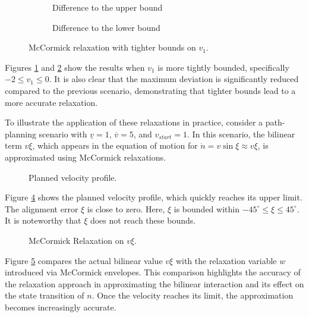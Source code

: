 \begin{figure}[h!]
	\centering
	\begin{subfigure}[b]{0.45\textwidth}
		\centering
		\resizebox{\textwidth}{!}{}
		\caption{Difference to the upper bound}
		\label{fig:mccormick_1_upper}
	\end{subfigure}
	\hfill
	\begin{subfigure}[b]{0.45\textwidth}
		\centering
		\resizebox{\textwidth}{!}{}
		\caption{Difference to the lower bound}
		\label{fig:mccormick_1_lower}
	\end{subfigure}
	\caption{McCormick relaxation with tighter bounds on $ v_1 $.}
	\label{fig:mccormick_bounds_1}
\end{figure}
Figures \ref{fig:mccormick_1_upper} and \ref{fig:mccormick_1_lower} show the results when $ v_1 $ is more tightly bounded, specifically $ -2 \leq v_1
	\leq 0 $.
It is also clear that the maximum deviation is significantly reduced compared to the previous scenario, demonstrating that tighter bounds lead to a
more accurate relaxation.

To illustrate the application of these relaxations in practice, consider a path-planning scenario with \( \underline{v} = 1 \), \( \overline{v} = 5
\), and \( v_{start} = 1 \).
In this scenario, the bilinear term \( v\xi \), which appears in the equation of motion for \(\dot{n} = v \sin{\xi} \approx v\xi\), is approximated
using McCormick relaxations.

\begin{figure}[h]
	\centering
	\resizebox{1\textwidth}{!}{}
	\caption{Planned velocity profile.}
	\label{fig:velocity}
\end{figure}

Figure \ref{fig:velocity} shows the planned velocity profile, which quickly reaches its upper limit.
The alignment error $\xi$ is close to zero.
Here, \( \xi \) is bounded within \(-45^{\circ} \leq \xi \leq 45^{\circ} \).
It is noteworthy that \( \xi \) does not reach these bounds.

\begin{figure}[h]
	\centering
	\resizebox{0.6\textwidth}{!}{}
	\caption{McCormick Relaxation on $v\xi$.}
	\label{fig:dn-term-approx}
\end{figure}

Figure \ref{fig:dn-term-approx} compares the actual bilinear value \( v\xi \) with the relaxation variable \( w \) introduced via McCormick
envelopes.
This comparison highlights the accuracy of the relaxation approach in approximating the bilinear interaction and its effect on the state transition
of \( n \).
Once the velocity reaches its limit, the approximation becomes increasingly accurate.

